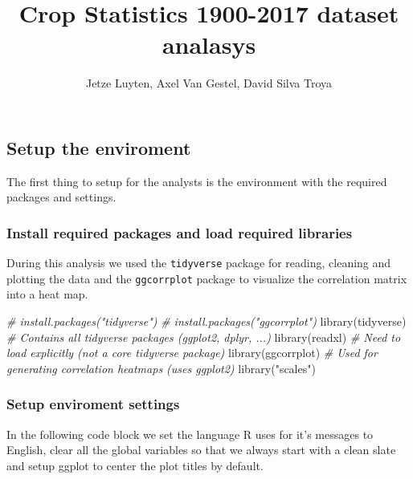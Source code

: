 \documentclass[
]{article}
\title{Crop Statistics 1900-2017 dataset analasys}
\author{Jetze Luyten, Axel Van Gestel, David Silva Troya}
\date{}
\newenvironment{Shaded}{\begin{snugshade}}{\end{snugshade}}
\newcommand{\CommentTok}[1]{\textcolor[rgb]{0.56,0.35,0.01}{\textit{#1}}}
\newcommand{\FunctionTok}[1]{\textcolor[rgb]{0.00,0.00,0.00}{#1}}
\newcommand{\NormalTok}[1]{#1}
\newcommand{\StringTok}[1]{\textcolor[rgb]{0.31,0.60,0.02}{#1}}
\begin{document}
\maketitle

\hypertarget{setup-the-enviroment}{%
\subsection{Setup the enviroment}\label{setup-the-enviroment}}

The first thing to setup for the analysts is the environment with the
required packages and settings.

\hypertarget{install-required-packages-and-load-required-libraries}{%
\subsubsection{Install required packages and load required
libraries}\label{install-required-packages-and-load-required-libraries}}

During this analysis we used the \texttt{tidyverse} package for reading,
cleaning and plotting the data and the \texttt{ggcorrplot} package to
visualize the correlation matrix into a heat map.

\begin{Shaded}
\begin{Highlighting}[]
\CommentTok{\# install.packages("tidyverse")}
\CommentTok{\# install.packages("ggcorrplot")}
\FunctionTok{library}\NormalTok{(tidyverse) }\CommentTok{\# Contains all tidyverse packages (ggplot2, dplyr, ...)}
\FunctionTok{library}\NormalTok{(readxl) }\CommentTok{\#  Need to load explicitly (not a core tidyverse package)}
\FunctionTok{library}\NormalTok{(ggcorrplot) }\CommentTok{\# Used for generating correlation heatmaps (uses ggplot2)}
\FunctionTok{library}\NormalTok{(}\StringTok{"scales"}\NormalTok{)}
\end{Highlighting}
\end{Shaded}

\hypertarget{setup-enviroment-settings}{%
\subsubsection{Setup enviroment
settings}\label{setup-enviroment-settings}}

In the following code block we set the language R uses for it's messages
to English, clear all the global variables so that we always start with
a clean slate and setup ggplot to center the plot titles by default.
\end{document}
